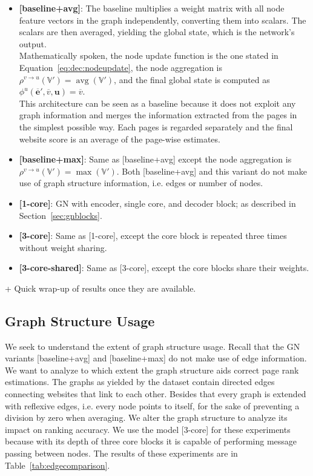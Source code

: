 \begin{itemize}
    \item \textbf{[baseline+avg]}: The baseline multiplies a weight matrix with all node feature vectors in the graph independently, converting them into scalars. The scalars are then averaged, yielding the global state, which is the network's output.\\
    Mathematically spoken, the node update function is the one stated in Equation~\ref{eq:dec:nodeupdate}, the node aggregation is $\rho^{v\rightarrow u}\left(\mathbb{V}'\right)=\operatorname{avg}\left(\mathbb{V}'\right)$, and the final global state is computed as $\phi^u\left(\bm{\overline{e}}',\overline{v},\bm{u}\right)=\overline{v}$.\\
    This architecture can be seen as a baseline because it does not exploit any graph information and merges the information extracted from the pages in the simplest possible way. Each pages is regarded separately and the final website score is an average of the page-wise estimates.
    \item \textbf{[baseline+max]}: Same as [baseline+avg] except the node aggregation is $\rho^{v\rightarrow u}\left(\mathbb{V}'\right)=\operatorname{max}\left(\mathbb{V}'\right)$. Both [baseline+avg] and this variant do not make use of graph structure information, i.e. edges or number of nodes.
    \item \textbf{[1-core]}: GN with encoder, single core, and decoder block; as described in Section~\ref{sec:gnblocks}.
    \item \textbf{[3-core]}: Same as [1-core], except the core block is repeated three times without weight sharing.
    \item \textbf{[3-core-shared]}: Same as [3-core], except the core blocks share their weights.
\end{itemize}

+ Quick wrap-up of results once they are available.

\subsection{Graph Structure Usage}

We seek to understand the extent of graph structure usage. Recall that the GN variants [baseline+avg] and [baseline+max] do not make use of edge information. We want to analyze to which extent the graph structure aids correct page rank estimations. The graphs as yielded by the dataset contain directed edges connecting websites that link to each other. Besides that every graph is extended with reflexive edges, i.e. every node points to itself, for the sake of preventing a division by zero when averaging. We alter the graph structure to analyze its impact on ranking accuracy. We use the model [3-core] for these experiments because with its depth of three core blocks it is capable of performing message passing between nodes. The results of these experiments are in Table~\ref{tab:edgecomparison}.


